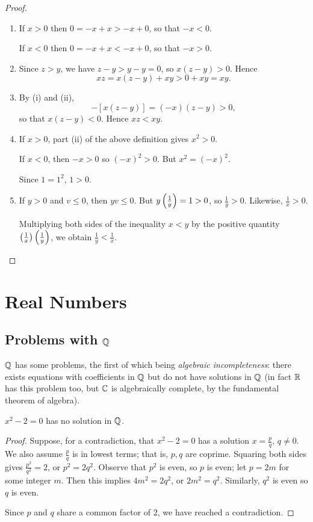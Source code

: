 \begin{proof} \
\begin{enumerate}[label=(\roman*)]
\item If $x>0$ then $0=-x+x>-x+0$, so that $-x<0$.

If $x<0$ then $0=-x+x<-x+0$, so that $-x>0$.
\item Since $z>y$, we have $z-y>y-y=0$, so $x(z-y)>0$. Hence
\[xz=x(z-y)+xy>0+xy=xy.\]
\item By (i) and (ii),
\[-[x(z-y)]=(-x)(z-y)>0,\]
so that $x(z-y)<0$. Hence $xz<xy$.
\item If $x>0$, part (ii) of the above definition gives $x^2>0$.

If $x<0$, then $-x>0$ so $(-x)^2>0$. But $x^2=(-x)^2$.

Since $1=1^2$, $1>0$.
\item If $y>0$ and $v\le0$, then $yv\le 0$. But $y\left(\frac{1}{y}\right)=1>0$, so $\frac{1}{y}>0$. Likewise, $\frac{1}{x}>0$.

Multiplying both sides of the inequality $x<y$ by the positive quantity $\left(\frac{1}{x}\right)\left(\frac{1}{y}\right)$, we obtain $\frac{1}{y}<\frac{1}{x}$.
\end{enumerate}
\end{proof}
\pagebreak

\section{Real Numbers}
\subsection{Problems with $\mathbb Q$}
$\mathbb Q$ has some problems, the first of which being \emph{algebraic incompleteness}: there exists equations with coefficients in $\mathbb Q$ but do not have solutions in $\mathbb Q$ (in fact $\mathbb R$ has this problem too, but $\mathbb C$ is algebraically complete, by the fundamental theorem of algebra).

\begin{lemma}
$x^2-2=0$ has no solution in $\mathbb Q$.
\end{lemma}

\begin{proof}
Suppose, for a contradiction, that $x^2-2=0$ has a solution $x=\frac{p}{q}$, $q\neq0$. We also assume $\frac{p}{q}$ is in lowest terms; that is, $p,q$ are coprime. Squaring both sides gives $\frac{p^2}{q^2}=2$, or $p^2=2q^2$. Observe that $p^2$ is even, so $p$ is even; let $p=2m$ for some integer $m$. Then this implies $4m^2=2q^2$, or $2m^2=q^2$. Similarly, $q^2$ is even so $q$ is even.

Since $p$ and $q$ share a common factor of $2$, we have reached a contradiction.
\end{proof}

